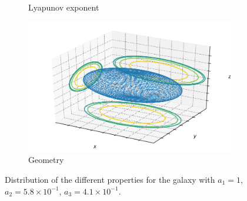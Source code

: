 \begin{figure}[h]
\begin{subfigure}[t]{0.4\textwidth}
        \caption{Lyapunov exponent}
    \end{subfigure}
    \begin{subfigure}[t]{0.4\textwidth}
        \includegraphics[width=\textwidth]{"../Files/Week 13/images/7_ellipsoid"}
        \caption{Geometry}
    \end{subfigure}
    \caption{Distribution of the different properties for the galaxy with $a_1 = 1$, $a_2 = 5.8\times10^{-1}$, $a_3 = 4.1\times10^{-1}$.}
\end{figure}


